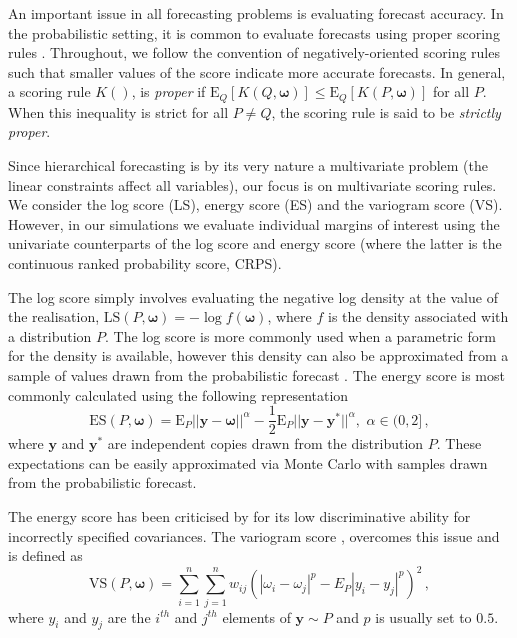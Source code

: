 \documentclass[12pt]{article}
\def\E{\text{E}}
\theoremstyle{definition}
\begin{document}
An important issue in all forecasting problems is evaluating forecast accuracy. In the probabilistic setting, it is common to evaluate forecasts using proper scoring rules \citep[see][and references therein]{Gneiting2007,Gneiting2014}. Throughout, we follow the convention of negatively-oriented scoring rules such that smaller values of the score indicate more accurate forecasts.  In general, a scoring rule $K()$, is {\em proper} if $\E_{Q}[K(Q,\bm{\omega})] \le \E_{Q}[K(P,{\bm\omega})]$ for all $P$. When this inequality is strict for all $P\neq Q$, the scoring rule is said to be {\em strictly proper}.

Since hierarchical forecasting is by its very nature a multivariate problem (the linear constraints affect all variables), our focus is on multivariate scoring rules.  We consider the log score (LS), energy score (ES) and the variogram score (VS).  However, in our simulations we evaluate individual margins of interest using the univariate counterparts of the log score and energy score (where the latter is the continuous ranked probability score, CRPS).

The log score simply involves evaluating the negative log density at the value of the realisation, $\text{LS}(P,\bm\omega)=-\log f(\bm\omega)$, where $f$ is the density associated with a distribution $P$.  The log score is more commonly used when a parametric form for the density is available, however  this density can also be approximated from a sample of values drawn from the probabilistic forecast \citep[see][]{Jordan2017}.  The energy score is most commonly calculated using the following representation
\begin{equation*}\label{eq:Energy_score}
\text{ES}(P,\bm{\omega}) =
\E_{P}
||{\bm{y}}-\bm{\omega}||^\alpha -\frac{1}{2}\E_{P}||\bm{y}-\bm{y}^*||^\alpha, \,\, \alpha \in (0,2]\,,
\end{equation*}
where $\bm {y}$ and $\bm{y^*}$ are independent copies drawn from the distribution $P$.  These expectations can be easily approximated via Monte Carlo with samples drawn from the probabilistic forecast.

The energy score has been criticised by \citet{Pinson2013a} for its low discriminative ability for incorrectly specified covariances.  The variogram score  \citep{SCHEUERER2015}, overcomes this issue and is defined as
\begin{equation*}
\text{VS}({P}, \bm{\omega}) = \displaystyle\sum_{i=1}^{n}\displaystyle\sum_{j=1}^{n}w_{ij}\left(|\omega_{i} - \omega_{j}|^p - E_{P} |{y}_{i}-{y}_{j}|^p\right)^2\,,
\end{equation*}
where $y_i$ and $y_j$ are the $i^{th}$ and $j^{th}$ elements of $\bm{y}\sim P$ and $p$ is usually set to $0.5$.
\end{document}
